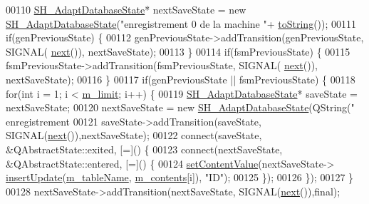 \begin{DoxyCode}
00110                 \hyperlink{classSH__AdaptDatabaseState}{SH\_AdaptDatabaseState}* nextSaveState = \textcolor{keyword}{new} 
      \hyperlink{classSH__AdaptDatabaseState}{SH\_AdaptDatabaseState}(\textcolor{stringliteral}{"enregistrement 0 de la machine "}+
      \hyperlink{classSH__InOutStateMachine_abfd2be3aa5860e0e92a1a6d30f8e36ce}{toString}());
00111                 \textcolor{keywordflow}{if}(genPreviousState) \{
00112                     genPreviousState->addTransition(genPreviousState, SIGNAL(
      \hyperlink{classSH__InOutStateMachine_a9cd7dbaf4da10a65d788a5d85397bebe}{next}()), nextSaveState);
00113                 \}
00114                 \textcolor{keywordflow}{if}(fsmPreviousState) \{
00115                     fsmPreviousState->addTransition(fsmPreviousState, SIGNAL(
      \hyperlink{classSH__InOutStateMachine_a9cd7dbaf4da10a65d788a5d85397bebe}{next}()), nextSaveState);
00116                 \}
00117                 \textcolor{keywordflow}{if}(genPreviousState || fsmPreviousState) \{
00118                     \textcolor{keywordflow}{for}(\textcolor{keywordtype}{int} i = 1; i < \hyperlink{classSh__LoopingInOutStateMachine_a320ece6cf74c2667c70059b9421117fb}{m\_limit}; i++) \{
00119                         \hyperlink{classSH__AdaptDatabaseState}{SH\_AdaptDatabaseState}* saveState = nextSaveState;
00120                         nextSaveState = \textcolor{keyword}{new} \hyperlink{classSH__AdaptDatabaseState}{SH\_AdaptDatabaseState}(QString(\textcolor{stringliteral}{"
      enregistrement %
00121                         saveState->addTransition(saveState, SIGNAL(\hyperlink{classSH__InOutStateMachine_a9cd7dbaf4da10a65d788a5d85397bebe}{next}()),nextSaveState);
00122                         connect(saveState, &QAbstractState::exited, [=]() \{
00123                             connect(nextSaveState, &QAbstractState::entered, [=]() \{
00124                                 \hyperlink{classSH__InOutStateMachine_a9ab1534306b2bdb62743d4bcefe40c17}{setContentValue}(nextSaveState->
      \hyperlink{classSH__AdaptDatabaseState_a037db544ea05f42d21fcbdda758839fe}{insertUpdate}(\hyperlink{classSH__InOutStateMachine_acc0f5d5133af2dcca30939f53ec8837b}{m\_tableName}, \hyperlink{classSh__LoopingInOutStateMachine_a267e7cbcb3d6a137e2a4e1f93fb57e68}{m\_contents}[i]), \textcolor{stringliteral}{"ID"});
00125                             \});
00126                         \});
00127                     \}
00128                     nextSaveState->addTransition(nextSaveState, SIGNAL(\hyperlink{classSH__InOutStateMachine_a9cd7dbaf4da10a65d788a5d85397bebe}{next}()),\textcolor{keyword}{final});
}
\end{DoxyCode}
